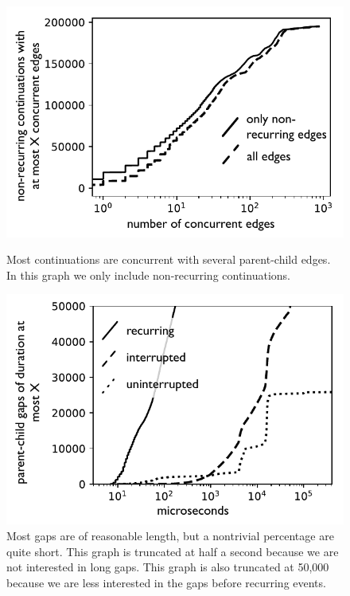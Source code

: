 \documentclass[acmsmall,anonymous,review]{acmart}\settopmatter{printfolios=true,printccs=false,printacmref=false}
\begin{document}
\begin{figure}
    \centering
    \begin{minipage}[t]{0.47\textwidth}
        \centering
        \includegraphics[width=1.0\textwidth]{Graphs/concurrency_bw}
        \caption{Most continuations are concurrent with several parent-child edges.
        In this graph we only include non-recurring continuations.}
        \label{fig:graph_concurrency}
    \end{minipage}\hfill
    \begin{minipage}[t]{0.47\textwidth}
        \centering
        \includegraphics[width=1.0\textwidth]{Graphs/gaps_bw}
        \caption{
          Most gaps are of reasonable length, but a nontrivial percentage are quite short.
          This graph is truncated at half a second because we are not interested in long gaps.
          This graph is also truncated at 50,000 because we are less interested in the gaps before recurring events.}
        \label{fig:graph_gaps}
    \end{minipage}
\end{figure}
\end{document}
